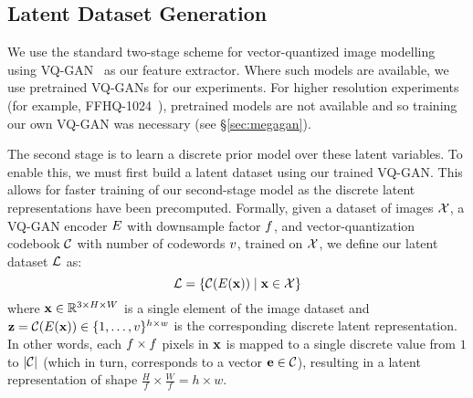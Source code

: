 
\subsection{Latent Dataset Generation}
We use the standard two-stage scheme for vector-quantized image
modelling~\cite{oord2018neural,razavi2019generating,esser2021taming,bondtaylor2021unleashing}
using VQ-GAN~\cite{esser2021taming} as our feature extractor. Where such models
are available, we use pretrained VQ-GANs for our experiments. For higher
resolution experiments (for example, FFHQ-1024~\cite{karras2019stylebased}),
pretrained models are not available and so training our own VQ-GAN was necessary
(see \S\ref{sec:megagan}).

The second stage is to learn a discrete prior model over these latent variables.
To enable this, we must first build a latent dataset using our trained VQ-GAN.
This allows for faster training of our second-stage model as the discrete latent
representations have been precomputed. Formally, given a dataset of images
$\mathcal{X}$, a VQ-GAN encoder $E$ with downsample factor
$f$, and vector-quantization codebook $\mathcal{C}$ with
number of codewords $v$, trained on $\mathcal{X}$, we define our
latent dataset $\mathcal{L}$ as:
\begin{equation}
    \mathcal{L} = \{\mathcal{C}(E(\mathbf{x})) \mid \mathbf{x} \in \mathcal{X} \}
\end{equation}
where $\mathbf{x} \in \mathbb{R}^{3 \times H \times W}$ is a single element of the image
dataset and $\mathbf{z} = \mathcal{C}(E(\mathbf{x})) \in \{1, \dots,
v\}^{h \times w}$ is the corresponding discrete latent
representation. In other words, each $f \times f$
pixels in $\mathbf{x}$ is mapped to a single discrete value from $1$ to
$|\mathcal{C}|$ (which in turn, corresponds to a vector $\mathbf{e} \in
\mathcal{C}$),
resulting in a latent representation of shape $\frac{H}{f} \times \frac{W}{f} =
h \times w$.

